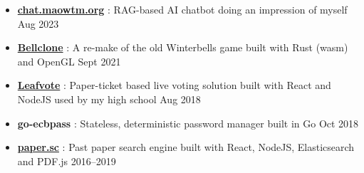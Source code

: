   \begin{itemize}
    \item \href{https://chat.maowtm.org}{\textbf{\color{link}chat.maowtm.org}} : RAG-based AI chatbot doing an impression of myself \dashdiv{} Aug 2023



    \item \href{https://bellclone.maowtm.org/}{\color{link}\textbf{Bellclone}} : A re-make of the old Winterbells game built with Rust (wasm) and OpenGL \dashdiv{} Sept 2021


    \item \href{https://leafvote.mww.moe}{\color{link}\textbf{Leafvote}} : Paper-ticket based live voting solution built with React and NodeJS used by my high school \dashdiv{} Aug 2018


    \item \textbf{go-ecbpass} : Stateless, deterministic password manager built in Go \dashdiv{} Oct 2018

    \item \href{https://paper.sc}{\color{link}\textbf{paper.sc}} : Past paper search engine built with React, NodeJS, Elasticsearch and PDF.js \dashdiv{} 2016--2019


\end{itemize}
